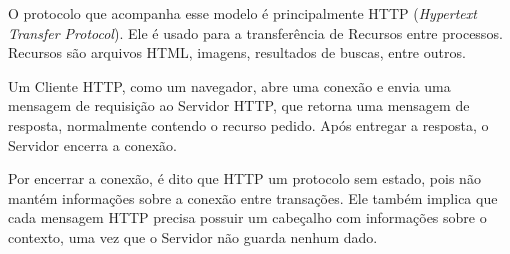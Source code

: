 \documentclass[a4paper,12pt]{article}
\begin{document}
O protocolo que acompanha esse modelo é principalmente HTTP (\emph{Hypertext Transfer Protocol}). Ele é usado para a transferência de Recursos entre processos. Recursos são arquivos HTML, imagens, resultados de buscas, entre outros.

Um Cliente HTTP, como um navegador, abre uma conexão e envia uma mensagem de requisição ao Servidor HTTP, que retorna uma mensagem de resposta, normalmente contendo o recurso pedido. Após entregar a resposta, o Servidor encerra a conexão.

Por encerrar a conexão, é dito que HTTP um protocolo sem estado, pois não mantém informações sobre a conexão entre transações. Ele também implica que cada mensagem HTTP precisa possuir um cabeçalho com informações sobre o contexto, uma vez que o Servidor não guarda nenhum dado.






\end{document}
